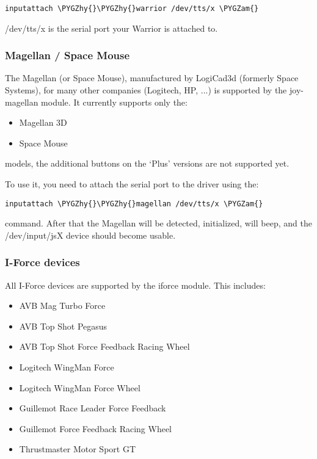 \documentclass[a4paper,8pt,english]{sphinxmanual}
\def\PYGZam{\char`\&}
\def\PYGZhy{\char`\-}
\begin{document}
\begin{Verbatim}[commandchars=\\\{\}]
inputattach \PYGZhy{}\PYGZhy{}warrior /dev/tts/x \PYGZam{}
\end{Verbatim}

/dev/tts/x is the serial port your Warrior is attached to.


\subsubsection{Magellan / Space Mouse}
\label{input/joydev/joystick:magellan-space-mouse}
The Magellan (or Space Mouse), manufactured by LogiCad3d (formerly Space
Systems), for many other companies (Logitech, HP, ...) is supported by the
joy-magellan module. It currently supports only the:
\begin{itemize}
\item {} 
Magellan 3D

\item {} 
Space Mouse

\end{itemize}

models, the additional buttons on the `Plus' versions are not supported yet.

To use it, you need to attach the serial port to the driver using the:

\begin{Verbatim}[commandchars=\\\{\}]
inputattach \PYGZhy{}\PYGZhy{}magellan /dev/tts/x \PYGZam{}
\end{Verbatim}

command. After that the Magellan will be detected, initialized, will beep,
and the /dev/input/jsX device should become usable.


\subsubsection{I-Force devices}
\label{input/joydev/joystick:i-force-devices}
All I-Force devices are supported by the iforce module. This includes:
\begin{itemize}
\item {} 
AVB Mag Turbo Force

\item {} 
AVB Top Shot Pegasus

\item {} 
AVB Top Shot Force Feedback Racing Wheel

\item {} 
Logitech WingMan Force

\item {} 
Logitech WingMan Force Wheel

\item {} 
Guillemot Race Leader Force Feedback

\item {} 
Guillemot Force Feedback Racing Wheel

\item {} 
Thrustmaster Motor Sport GT

\end{itemize}
\end{document}
